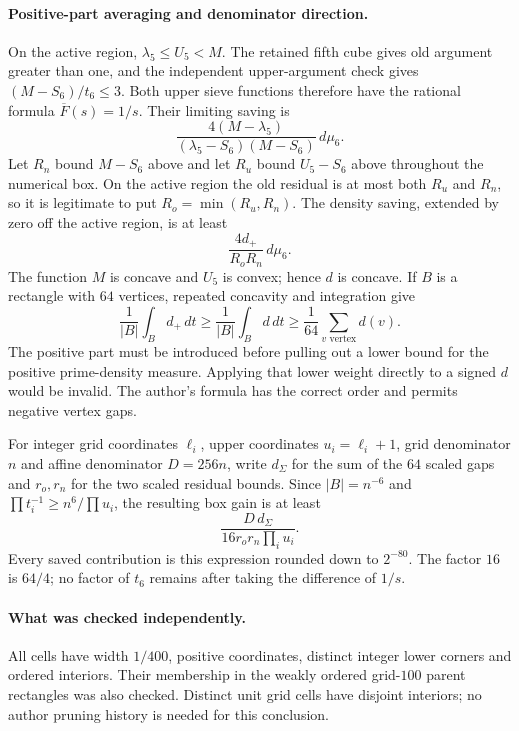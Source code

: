 \paragraph{Positive-part averaging and denominator direction.}
On the active region, $\lambda_5\le U_5<M$. The retained fifth
cube gives old argument greater than one, and the independent
upper-argument check gives $(M-S_6)/t_6\le3$. Both upper sieve
functions therefore have the rational formula
$\overline F(s)=1/s$. Their limiting saving is
\[
 \frac{4(M-\lambda_5)}{(\lambda_5-S_6)(M-S_6)}\,d\mu_6.
\]
Let $R_n$ bound $M-S_6$ above and let $R_u$ bound $U_5-S_6$
above throughout the numerical box. On the active region the old
residual is at most both $R_u$ and $R_n$, so it is legitimate to put
$R_o=\min(R_u,R_n)$. The density saving, extended by zero off the
active region, is at least
\[
 \frac{4d_+}{R_oR_n}\,d\mu_6.
\]
The function $M$ is concave and $U_5$ is convex; hence $d$ is
concave. If $B$ is a rectangle with $64$ vertices, repeated concavity
and integration give
\[
 \frac1{|B|}\int_Bd_+\,dt
 \ge\frac1{|B|}\int_Bd\,dt
 \ge\frac1{64}\sum_{v\text{ vertex}}d(v).
\]
The positive part must be introduced before pulling out a lower
bound for the positive prime-density measure. Applying that lower
weight directly to a signed $d$ would be invalid. The author's
formula has the correct order and permits negative vertex gaps.

For integer grid coordinates $\ell_i$, upper coordinates
$u_i=\ell_i+1$, grid denominator $n$ and affine denominator
$D=256n$, write $d_\Sigma$ for the sum of the $64$ scaled gaps and
$r_o,r_n$ for the two scaled residual bounds. Since
$|B|=n^{-6}$ and $\prod t_i^{-1}\ge n^6/\prod u_i$, the resulting
box gain is at least
\begin{equation}\label{eq:sixth-expanded-independent-term}
 \frac{D\,d_\Sigma}{16r_or_n\prod_i u_i}.
\end{equation}
Every saved contribution is this expression rounded down to
$2^{-80}$. The factor $16$ is $64/4$; no factor of $t_6$ remains
after taking the difference of $1/s$.

\paragraph{What was checked independently.}
All cells have width $1/400$, positive coordinates, distinct integer
lower corners and ordered interiors. Their membership in the weakly
ordered grid-$100$ parent rectangles was also checked. Distinct unit
grid cells have disjoint interiors; no author pruning history is needed
for this conclusion.

